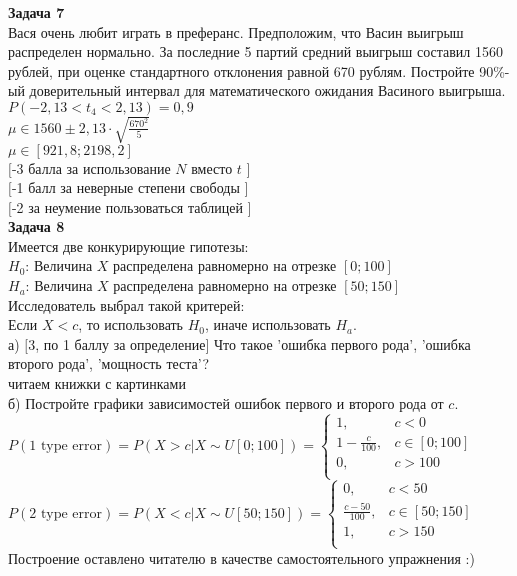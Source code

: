 \documentclass[pdftex,12pt,a4paper]{article}
\begin{document}
{\bf Задача 7} \\
Вася очень любит играть в преферанс. Предположим, что Васин
выигрыш распределен нормально. За последние 5 партий средний
выигрыш составил 1560 рублей, при оценке стандартного отклонения
равной 670 рублям. Постройте 90\%-ый доверительный интервал для
математического ожидания Васиного выигрыша. \\
$P(-2,13<t_{4}<2,13)=0,9$ \\
$\mu \in 1560 \pm 2,13\cdot \sqrt{\frac{670^{2}}{5}}$ \\
$\mu \in [921,8;2198,2]$ \\
$[$-3 балла за использование $N$ вместо $t$ $]$ \\
$[$-1 балл за неверные степени свободы $]$ \\
$[$-2 за неумение пользоваться таблицей $]$ \\

{\bf Задача 8} \\
Имеется две конкурирующие гипотезы: \\
$H_{0}$: Величина $X$ распределена равномерно на отрезке $[0;100]$ \\
$H_{a}$: Величина $X$ распределена равномерно на отрезке $[50;150]$ \\
Исследователь выбрал такой критерей: \\
Если $X<c$, то использовать $H_{0}$, иначе использовать $H_{a}$. \\
а) $[$3, по 1 баллу за определение$]$ Что такое 'ошибка первого
рода', 'ошибка второго рода',
'мощность теста'? \\
читаем книжки с картинками \\
б) Постройте графики зависимостей ошибок первого и второго рода от
$c$. \\
$P(\text{1 type error})=P(X>c|X\sim U[0;100])= \left\{
\begin{array}{ll}
  1, & c<0 \\
  1-\frac{c}{100}, & c \in [0;100] \\
  0, & c>100 \\
\end{array}
\right.$ \\
$P(\text{2 type error})=P(X<c|X\sim U[50;150])= \left\{
\begin{array}{ll}
  0, & c<50 \\
  \frac{c-50}{100}, & c \in [50;150] \\
  1, & c>150 \\
\end{array}
\right.$ \\
Построение оставлено читателю в качестве самостоятельного
упражнения :) \\
\end{document}
